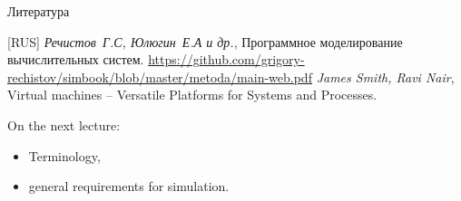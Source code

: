 \begin{frame}[allowframebreaks]{Литература}
\begin{thebibliography}{99}
  \bibitem{} [RUS] \textit{Речистов~Г.С, Юлюгин~Е.А и др.},
    Программное моделирование вычислительных систем.
    \url{https://github.com/grigory-rechistov/simbook/blob/master/metoda/main-web.pdf}
  \bibitem{} \textit{James Smith, Ravi Nair}, Virtual machines -- Versatile
    Platforms for Systems and Processes.
\end{thebibliography}
\end{frame}

\begin{frame}{On the next lecture:}
\begin{itemize}
\item Terminology,
\item general requirements for simulation.
\end{itemize}
\end{frame}

\finalslide


